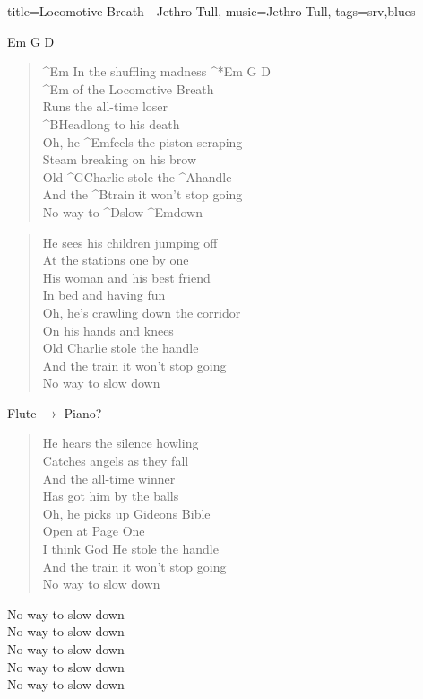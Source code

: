 \begin{song}{
		title={Locomotive Breath - Jethro Tull}, 
		music={Jethro Tull}, tags={srv,blues}}
\begin{intro}
	{Em} {G} D
\end{intro}
\begin{verse}
	^{Em} In the shuffling madness
^*{Em G D} \\
	^{Em} of the Locomotive Breath \\
	Runs the all-time loser \\
	^{B}Headlong to his death
\\
	Oh, he ^{Em}feels the piston scraping \\
	Steam breaking on his brow
\\
	Old ^{G}Charlie stole the ^{A}handle
\\
	And the ^{B}train it won't stop going \\
	No way to ^{D}slow ^{Em}down
\end{verse}

\begin{verse}
	He sees his children jumping off \\
	At the stations one by one
\\
	His woman and his best friend \\
	In bed and having fun
\\
	Oh, he's crawling down the corridor \\
	On his hands and knees
\\
	Old Charlie stole the handle \\
	And the train it won't stop going \\
	No way to slow down
\end{verse}

\begin{solo}
	Flute $\rightarrow$ Piano?
\end{solo}

\begin{verse}
	He hears the silence howling
\\
	Catches angels as they fall
\\
	And the all-time winner
\\
	Has got him by the balls
\\
	Oh, he picks up Gideons Bible \\
	Open at Page One
\\
	I think God He stole the handle \\
	And the train it won't stop going
\\
	No way to slow down
\end{verse}

\begin{outro}
	No way to slow down
\\
	No way to slow down
\\
	No way to slow down
\\
	No way to slow down
\\
	No way to slow down
\end{outro}

\end{song}
